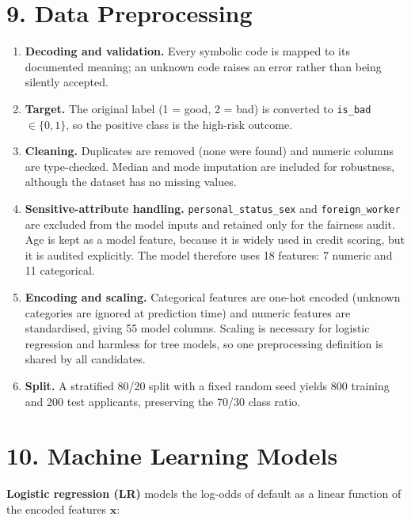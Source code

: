 \documentclass[
  11pt,
]{article}
\providecommand{\tightlist}{%
  \setlength{\itemsep}{0pt}\setlength{\parskip}{0pt}}
\begin{document}
\hypertarget{data-preprocessing}{%
\section{9. Data Preprocessing}\label{data-preprocessing}}

\begin{enumerate}
\def\labelenumi{\arabic{enumi}.}
\tightlist
\item
  \textbf{Decoding and validation.} Every symbolic code is mapped to its
  documented meaning; an unknown code raises an error rather than being
  silently accepted.
\item
  \textbf{Target.} The original label (1 = good, 2 = bad) is converted
  to \texttt{is\_bad} \(\in \{0, 1\}\), so the positive class is the
  high-risk outcome.
\item
  \textbf{Cleaning.} Duplicates are removed (none were found) and
  numeric columns are type-checked. Median and mode imputation are
  included for robustness, although the dataset has no missing values.
\item
  \textbf{Sensitive-attribute handling.} \texttt{personal\_status\_sex}
  and \texttt{foreign\_worker} are excluded from the model inputs and
  retained only for the fairness audit. Age is kept as a model feature,
  because it is widely used in credit scoring, but it is audited
  explicitly. The model therefore uses 18 features: 7 numeric and 11
  categorical.
\item
  \textbf{Encoding and scaling.} Categorical features are one-hot
  encoded (unknown categories are ignored at prediction time) and
  numeric features are standardised, giving 55 model columns. Scaling is
  necessary for logistic regression and harmless for tree models, so one
  preprocessing definition is shared by all candidates.
\item
  \textbf{Split.} A stratified 80/20 split with a fixed random seed
  yields 800 training and 200 test applicants, preserving the 70/30
  class ratio.
\end{enumerate}

\hypertarget{machine-learning-models}{%
\section{10. Machine Learning Models}\label{machine-learning-models}}

\textbf{Logistic regression (LR)} models the log-odds of default as a
linear function of the encoded features \(\mathbf{x}\):
\end{document}
